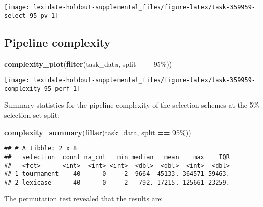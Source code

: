 \documentclass[
]{book}
\newenvironment{Shaded}{\begin{snugshade}}{\end{snugshade}}
\newcommand{\FunctionTok}[1]{\textcolor[rgb]{0.13,0.29,0.53}{\textbf{#1}}}
\newcommand{\NormalTok}[1]{#1}
\newcommand{\SpecialCharTok}[1]{\textcolor[rgb]{0.81,0.36,0.00}{\textbf{#1}}}
\newcommand{\StringTok}[1]{\textcolor[rgb]{0.31,0.60,0.02}{#1}}
\begin{document}
\texttt{[image: lexidate-holdout-supplemental\_files/figure-latex/task-359959-select-95-pv-1]}

\hypertarget{pipeline-complexity-37}{%
\subsection{Pipeline complexity}\label{pipeline-complexity-37}}

\begin{Shaded}
\begin{Highlighting}[]
\FunctionTok{complexity\_plot}\NormalTok{(}\FunctionTok{filter}\NormalTok{(task\_data, split }\SpecialCharTok{==} \StringTok{\textquotesingle{}95\%\textquotesingle{}}\NormalTok{))}
\end{Highlighting}
\end{Shaded}

\texttt{[image: lexidate-holdout-supplemental\_files/figure-latex/task-359959-complexity-95-perf-1]}

Summary statistics for the pipeline complexity of the selection schemes at the 5\% selection set split:

\begin{Shaded}
\begin{Highlighting}[]
\FunctionTok{complexity\_summary}\NormalTok{(}\FunctionTok{filter}\NormalTok{(task\_data, split }\SpecialCharTok{==} \StringTok{\textquotesingle{}95\%\textquotesingle{}}\NormalTok{))}
\end{Highlighting}
\end{Shaded}

\begin{verbatim}
## # A tibble: 2 x 8
##   selection  count na_cnt   min median   mean    max    IQR
##   <fct>      <int>  <int> <int>  <dbl>  <dbl>  <int>  <dbl>
## 1 tournament    40      0     2  9664  45133. 364571 59463.
## 2 lexicase      40      0     2   792. 17215. 125661 23259.
\end{verbatim}

The permutation test revealed that the results are:
\end{document}
